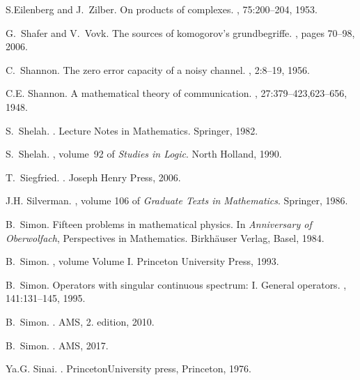 \documentclass[12pt]{amsart}
\begin{document}
\begin{thebibliography}{100}
S.Eilenberg and J.~Zilber.
\newblock On products of complexes.
, 75:200--204, 1953.

G.~Shafer and V.~Vovk.
\newblock The sources of komogorov's grundbegriffe.
, pages 70--98, 2006.

C.~Shannon.
\newblock The zero error capacity of a noisy channel.
, 2:8--19, 1956.

C.E. Shannon.
\newblock A mathematical theory of communication.
, 27:379--423,623--656, 1948.

S.~Shelah.
.
\newblock Lecture Notes in Mathematics. Springer, 1982.

S.~Shelah.
, volume~92 of {\em Studies in Logic}.
\newblock North Holland, 1990.

T.~Siegfried.
.
\newblock Joseph Henry Press, 2006.

J.H. Silverman.
, volume 106 of {\em Graduate
  Texts in Mathematics}.
\newblock Springer, 1986.

B.~Simon.
\newblock Fifteen problems in mathematical physics.
\newblock In {\em Anniversary of Oberwolfach}, Perspectives in Mathematics.
  {Birkh\"auser} Verlag, Basel, 1984.

B.~Simon.
, volume Volume I.
\newblock Princeton University Press, 1993.

B.~Simon.
\newblock Operators with singular continuous spectrum: {I}. {General}
  operators.
, 141:131--145, 1995.

B.~Simon.
.
\newblock AMS, 2. edition, 2010.

B.~Simon.
.
\newblock AMS, 2017.

Ya.G. Sinai.
.
\newblock Princeton{University} press, Princeton, 1976.


\end{thebibliography}
\end{document}
